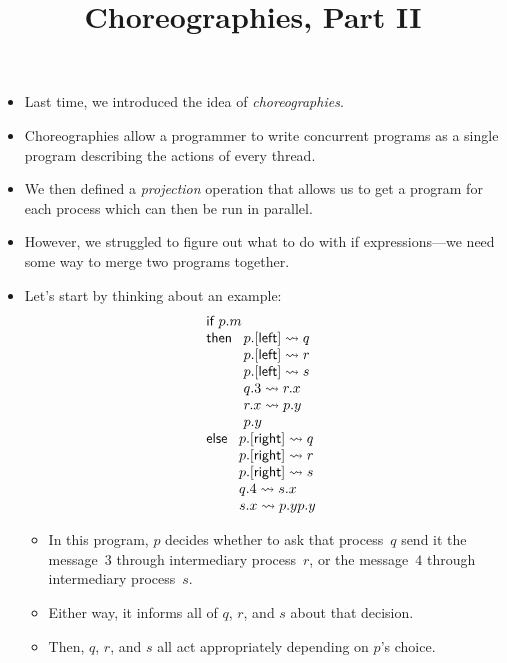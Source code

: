 \documentclass{lecturenotes}
\title{Choreographies, Part II}
\newcommand{\Left}{\textsf{left}\xspace}
\newcommand{\Right}{\textsf{right}\xspace}
\newcommand{\sendrecv}[4]{\ensuremath{#1.#2 \rightsquigarrow #3.#4}}
\newcommand{\syncmsg}[3]{\ensuremath{#1.[#2] \rightsquigarrow #3}}
\begin{document}
\maketitle

\begin{itemize}
\item Last time, we introduced the idea of \emph{choreographies}.
\item Choreographies allow a programmer to write concurrent programs as a single program describing the actions of every thread.
\item We then defined a \emph{projection} operation that allows us to get a program for each process which can then be  run in parallel.
\item However, we struggled to figure out what to do with \textsf{if} expressions---we need some way to merge two programs together.
\item Let's start by thinking about an example:
  $$
  \begin{array}{l}
    \textsf{if}~p.m\\
    \textsf{then}~\begin{array}[t]{l}
      \syncmsg{p}{\Left}{q}\\
      \syncmsg{p}{\Left}{r}\\
      \syncmsg{p}{\Left}{s}\\
      \sendrecv{q}{3}{r}{x}\\
      \sendrecv{r}{x}{p}{y}\\
      p.y
    \end{array}\\
    \textsf{else}~
    \begin{array}[t]{l}
      \syncmsg{p}{\Right}{q}\\
      \syncmsg{p}{\Right}{r}\\
      \syncmsg{p}{\Right}{s}\\
      \sendrecv{q}{4}{s}{x}\\
      \sendrecv{s}{x}{p}{y}
      p.y
    \end{array}
  \end{array}
  $$
  \begin{itemize}
  \item In this program, $p$ decides whether to ask that process~$q$ send it the message~$3$ through intermediary process~$r$, or the message~$4$ through intermediary process~$s$.
  \item Either way, it informs all of $q$, $r$, and $s$ about that decision.
  \item Then, $q$, $r$, and $s$ all act appropriately depending on $p$'s choice.

\end{itemize}
\end{itemize}
\end{document}
